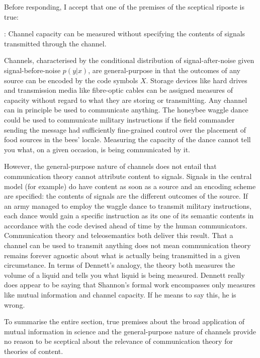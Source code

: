 \documentclass[12pt]{article}
\begin{document}
Before responding, I accept that one of the premises of the sceptical riposte is true:

\begin{myquote}
\cia{}: Channel capacity can be measured without specifying the contents of signals transmitted through the channel.
\end{myquote}

\noindent Channels, characterised by the conditional distribution of signal-after-noise given signal-before-noise $p(y|x)$, are general-purpose in that the outcomes of any source can be encoded by the code symbols $X$.
Storage devices like hard drives and transmission media like fibre-optic cables can be assigned measures of capacity without regard to what they are storing or transmitting.
Any channel can in principle be used to communicate anything.
The honeybee waggle dance could be used to communicate military instructions if the field commander sending the message had sufficiently fine-grained control over the placement of food sources in the bees' locale.
Measuring the capacity of the dance cannot tell you what, on a given occasion, is being communicated by it.

However, the general-purpose nature of channels does not entail that communication theory cannot attribute content to signals.
Signals in the central model (for example) do have content as soon as a source and an encoding scheme are specified: the contents of signals are the different outcomes of the source.
If an army managed to employ the waggle dance to transmit military instructions, each dance would gain a specific instruction as its one of its semantic contents in accordance with the code devised ahead of time by the human communicators.
Communication theory and teleosemantics both deliver this result.
That a channel can be used to transmit anything does not mean communication theory remains forever agnostic about what is actually being transmitted in a given circumstance.
In terms of Dennett's analogy, the theory both measures the volume of a liquid and tells you what liquid is being measured.
Dennett really does appear to be saying that Shannon's formal work encompasses only measures like mutual information and channel capacity.
If he means to say this, he is wrong.

To summarise the entire section, true premises about the broad application of mutual information in science and the general-purpose nature of channels provide no reason to be sceptical about the relevance of communication theory for theories of content.
\end{document}
